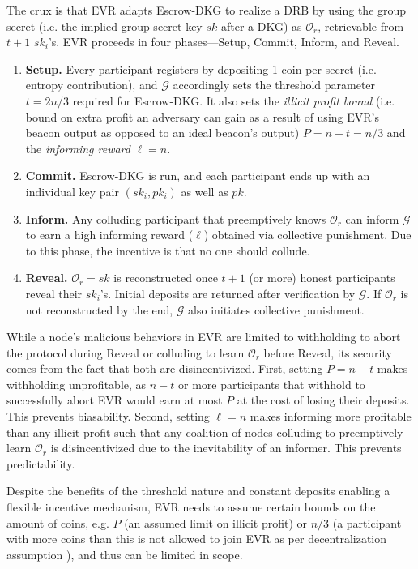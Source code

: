 \documentclass[conference]{IEEEtran}
\theoremstyle{definition}
\theoremstyle{remark}
\begin{document}
The crux is that EVR adapts Escrow-DKG to realize a DRB by using the group secret (i.e. the implied group secret key $sk$ after a DKG) as $\mathcal{O}_r$, retrievable from $t + 1$ $sk_i$'s. EVR proceeds in four phases---Setup, Commit, Inform, and Reveal.
\begin{enumerate}
    \item \textbf{Setup.} Every participant registers by depositing 1 coin per secret (i.e. entropy contribution), and $\mathcal{G}$ accordingly sets the threshold parameter $t = 2n / 3$ required for Escrow-DKG. It also sets the \textit{illicit profit bound} (i.e. bound on extra profit an adversary can gain as a result of using EVR's beacon output as opposed to an ideal beacon's output) $P = n - t = n / 3$ and the \textit{informing reward} $\ell = n$.
    \item \textbf{Commit.} Escrow-DKG is run, and each participant ends up with an individual key pair $(sk_i, pk_i)$ as well as $pk$.
    \item \textbf{Inform.} Any colluding participant that preemptively knows $\mathcal{O}_r$ can inform $\mathcal{G}$ to earn a high informing reward ($\ell$) obtained via collective punishment. Due to this phase, the incentive is that no one should collude.
    \item \textbf{Reveal.} $\mathcal{O}_r = sk$ is reconstructed once $t + 1$ (or more) honest participants reveal their $sk_i$'s. Initial deposits are returned after verification by $\mathcal{G}$. If $\mathcal{O}_r$ is not reconstructed by the end, $\mathcal{G}$ also initiates collective punishment.
\end{enumerate}

While a node's malicious behaviors in EVR are limited to withholding to abort the protocol during Reveal or colluding to learn $\mathcal{O}_r$ before Reveal, its security comes from the fact that both are disincentivized. First, setting $P = n - t$ makes withholding unprofitable, as $n - t$ or more participants that withhold to successfully abort EVR would earn at most $P$ at the cost of losing their deposits. This prevents biasability. Second, setting $\ell = n$ makes informing more profitable than any illicit profit such that any coalition of nodes colluding to preemptively learn $\mathcal{O}_r$ is disincentivized due to the inevitability of an informer. This prevents predictability.

Despite the benefits of the threshold nature and constant deposits enabling a flexible incentive mechanism, EVR needs to assume certain bounds on the amount of coins, e.g. $P$ (an assumed limit on illicit profit) or $n / 3$ (a participant with more coins than this is not allowed to join EVR as per decentralization assumption \cite{david2020economically}), and thus can be limited in scope.
\end{document}
